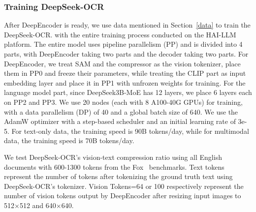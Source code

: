 \documentclass[11pt, a4paper, logo, copyright, nonumbering]{deepseek}
\begin{document}
\begin{CJK*}{UTF8}{gbsn}
\subsubsection{Training DeepSeek-OCR}
After DeepEncoder is ready, we use data mentioned in Section~\ref{data} to train the DeepSeek-OCR. with the entire training process conducted on the HAI-LLM~\cite{highflyer2023haillm} platform. The entire model uses pipeline parallelism (PP) and is divided into 4 parts, with DeepEncoder taking two parts and the decoder taking two parts. For DeepEncoder, we treat SAM and the compressor as the vision tokenizer, place them in PP0 and freeze their parameters, while treating the CLIP part as input embedding layer and place it in PP1 with unfrozen weights for training. For the language model part, since DeepSeek3B-MoE has 12 layers, we place 6 layers each on PP2 and PP3. We use 20 nodes (each with 8 A100-40G GPUs) for training, with a data parallelism (DP) of 40 and a global batch size of 640. We use the AdamW optimizer with a step-based scheduler and an initial learning rate of 3e-5. For text-only data, the training speed is 90B tokens/day, while for multimodal data, the training speed is 70B tokens/day.

\begin{table}[!h]\normalsize
	\centering	
        
 	\caption{We test DeepSeek-OCR's vision-text compression ratio using all English documents with 600-1300 tokens from the Fox~\cite{liu2024focus_fox} benchmarks. Text tokens represent the number of tokens after tokenizing the ground truth text using DeepSeek-OCR's tokenizer. Vision Tokens=64 or 100 respectively represent the number of vision tokens output by DeepEncoder after resizing input images to 512$\times$512 and 640$\times$640.}
    \setlength{\abovecaptionskip}{0.2cm}
	\setlength{\tabcolsep}{1.0mm}{	
		
}
\end{table}
\end{CJK*}
\end{document}
